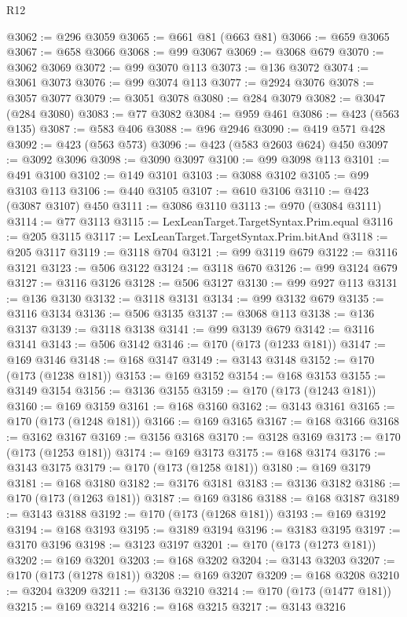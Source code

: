 \begin{lexlean}{R12}
\begin{coremodule}
@3062 := @296 @3059
@3065 := @661 @81 (@663 @81)
@3066 := @659 @3065
@3067 := @658 @3066
@3068 := @99 @3067
@3069 := @3068 @679
@3070 := @3062 @3069
@3072 := @99 @3070 @113
@3073 := @136 @3072
@3074 := @3061 @3073
@3076 := @99 @3074 @113
@3077 := @2924 @3076
@3078 := @3057 @3077
@3079 := @3051 @3078
@3080 := @284 @3079
@3082 := @3047 (@284 @3080)
@3083 := @77 @3082
@3084 := @959 @461
@3086 := @423 (@563 @135)
@3087 := @583 @406
@3088 := @96 @2946
@3090 := @419 @571 @428
@3092 := @423 (@563 @573)
@3096 := @423 (@583 @2603 @624) @450
@3097 := @3092 @3096
@3098 := @3090 @3097
@3100 := @99 @3098 @113
@3101 := @491 @3100
@3102 := @149 @3101
@3103 := @3088 @3102
@3105 := @99 @3103 @113
@3106 := @440 @3105
@3107 := @610 @3106
@3110 := @423 (@3087 @3107) @450
@3111 := @3086 @3110
@3113 := @970 (@3084 @3111)
@3114 := @77 @3113
@3115 := LexLeanTarget.TargetSyntax.Prim.equal
@3116 := @205 @3115
@3117 := LexLeanTarget.TargetSyntax.Prim.bitAnd
@3118 := @205 @3117
@3119 := @3118 @704
@3121 := @99 @3119 @679
@3122 := @3116 @3121
@3123 := @506 @3122
@3124 := @3118 @670
@3126 := @99 @3124 @679
@3127 := @3116 @3126
@3128 := @506 @3127
@3130 := @99 @927 @113
@3131 := @136 @3130
@3132 := @3118 @3131
@3134 := @99 @3132 @679
@3135 := @3116 @3134
@3136 := @506 @3135
@3137 := @3068 @113
@3138 := @136 @3137
@3139 := @3118 @3138
@3141 := @99 @3139 @679
@3142 := @3116 @3141
@3143 := @506 @3142
@3146 := @170 (@173 (@1233 @181))
@3147 := @169 @3146
@3148 := @168 @3147
@3149 := @3143 @3148
@3152 := @170 (@173 (@1238 @181))
@3153 := @169 @3152
@3154 := @168 @3153
@3155 := @3149 @3154
@3156 := @3136 @3155
@3159 := @170 (@173 (@1243 @181))
@3160 := @169 @3159
@3161 := @168 @3160
@3162 := @3143 @3161
@3165 := @170 (@173 (@1248 @181))
@3166 := @169 @3165
@3167 := @168 @3166
@3168 := @3162 @3167
@3169 := @3156 @3168
@3170 := @3128 @3169
@3173 := @170 (@173 (@1253 @181))
@3174 := @169 @3173
@3175 := @168 @3174
@3176 := @3143 @3175
@3179 := @170 (@173 (@1258 @181))
@3180 := @169 @3179
@3181 := @168 @3180
@3182 := @3176 @3181
@3183 := @3136 @3182
@3186 := @170 (@173 (@1263 @181))
@3187 := @169 @3186
@3188 := @168 @3187
@3189 := @3143 @3188
@3192 := @170 (@173 (@1268 @181))
@3193 := @169 @3192
@3194 := @168 @3193
@3195 := @3189 @3194
@3196 := @3183 @3195
@3197 := @3170 @3196
@3198 := @3123 @3197
@3201 := @170 (@173 (@1273 @181))
@3202 := @169 @3201
@3203 := @168 @3202
@3204 := @3143 @3203
@3207 := @170 (@173 (@1278 @181))
@3208 := @169 @3207
@3209 := @168 @3208
@3210 := @3204 @3209
@3211 := @3136 @3210
@3214 := @170 (@173 (@1477 @181))
@3215 := @169 @3214
@3216 := @168 @3215
@3217 := @3143 @3216

\end{coremodule}
\end{lexlean}
